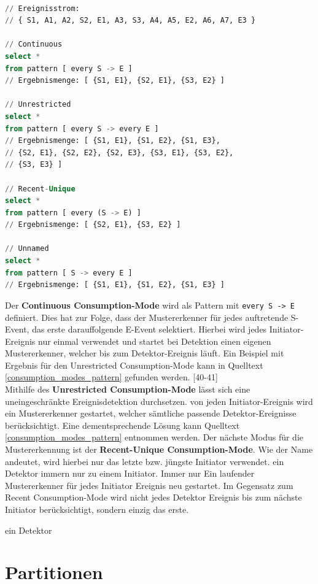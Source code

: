 \begin{lstlisting}[caption={Pattern Deklaration Consumption Modes},label=consumption_modes_pattern,captionpos=b,language=SQL]

// Ereignisstrom:
// { S1, A1, A2, S2, E1, A3, S3, A4, A5, E2, A6, A7, E3 }

// Continuous
select *
from pattern [ every S -> E ]
// Ergebnismenge: [ {S1, E1}, {S2, E1}, {S3, E2} ]

// Unrestricted
select *
from pattern [ every S -> every E ]
// Ergebnismenge: [ {S1, E1}, {S1, E2}, {S1, E3},
// {S2, E1}, {S2, E2}, {S2, E3}, {S3, E1}, {S3, E2},
// {S3, E3} ]

// Recent-Unique
select *
from pattern [ every (S -> E) ]
// Ergebnismenge: [ {S2, E1}, {S3, E2} ]

// Unnamed
select *
from pattern [ S -> every E ]
// Ergebnismenge: [ {S1, E1}, {S1, E2}, {S1, E3} ]

\end{lstlisting}
Der \textbf{Continuous Consumption-Mode} wird als Pattern mit \texttt{every S -> E} definiert. Dies hat zur Folge, dass der Mustererkenner für jedes auftretende S-Event, das erste darauffolgende E-Event selektiert. 
Hierbei wird jedes Initiator-Ereignis nur einmal verwendet und startet bei Detektion einen eigenen Mustererkenner, welcher bis zum Detektor-Ereignis läuft.
Ein Beispiel mit Ergebnis für den Unrestricted Consumption-Mode kann in Quelltext \ref{consumption_modes_pattern} gefunden werden.
\cite{CEP2017}[40-41]\\
\absatz
Mithilfe des \textbf{Unrestricted Consumption-Mode} lässt sich eine uneingeschränkte Ereignisdetektion durchsetzen. von jeden Initiator-Ereignis
wird ein Mustererkenner gestartet, welcher sämtliche passende Detektor-Ereignisse berücksichtigt. Eine dementsprechende Lösung kann Quelltext \ref{consumption_modes_pattern} entnommen werden.
\absatz
Der nächste Modus für die Mustererkennung ist der \textbf{Recent-Unique Consumption-Mode}.
Wie der Name andeutet, wird hierbei nur das letzte bzw. jüngste Initiator verwendet.
ein Detektor immern nur zu einem Initiator.
Immer nur Ein laufender Mustererkenner für jedes Initiator Ereignis neu gestartet.
Im Gegensatz zum Recent Consumption-Mode wird nicht jedes Detektor Ereignis bis zum nächste Initiator berücksichtigt, sondern einzig das erste.


ein Detektor


\section{Partitionen}

